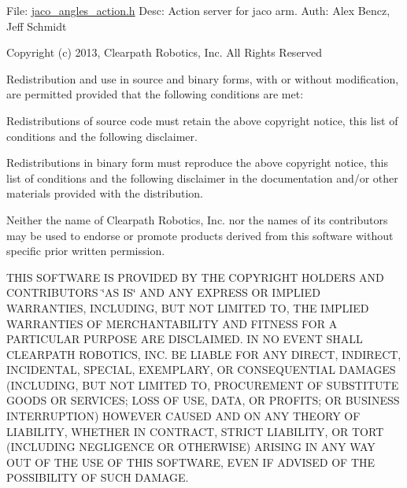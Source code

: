 File\+: \hyperlink{jaco__angles__action_8h}{jaco\+\_\+angles\+\_\+action.\+h} Desc\+: Action server for jaco arm. Auth\+: Alex Bencz, Jeff Schmidt

Copyright (c) 2013, Clearpath Robotics, Inc. All Rights Reserved

Redistribution and use in source and binary forms, with or without modification, are permitted provided that the following conditions are met\+:
\begin{DoxyItemize}
\item Redistributions of source code must retain the above copyright notice, this list of conditions and the following disclaimer.
\item Redistributions in binary form must reproduce the above copyright notice, this list of conditions and the following disclaimer in the documentation and/or other materials provided with the distribution.
\item Neither the name of Clearpath Robotics, Inc. nor the names of its contributors may be used to endorse or promote products derived from this software without specific prior written permission.
\end{DoxyItemize}

T\+H\+IS S\+O\+F\+T\+W\+A\+RE IS P\+R\+O\+V\+I\+D\+ED BY T\+HE C\+O\+P\+Y\+R\+I\+G\+HT H\+O\+L\+D\+E\+RS A\+ND C\+O\+N\+T\+R\+I\+B\+U\+T\+O\+RS \char`\"{}\+A\+S I\+S\char`\"{} A\+ND A\+NY E\+X\+P\+R\+E\+SS OR I\+M\+P\+L\+I\+ED W\+A\+R\+R\+A\+N\+T\+I\+ES, I\+N\+C\+L\+U\+D\+I\+NG, B\+UT N\+OT L\+I\+M\+I\+T\+ED TO, T\+HE I\+M\+P\+L\+I\+ED W\+A\+R\+R\+A\+N\+T\+I\+ES OF M\+E\+R\+C\+H\+A\+N\+T\+A\+B\+I\+L\+I\+TY A\+ND F\+I\+T\+N\+E\+SS F\+OR A P\+A\+R\+T\+I\+C\+U\+L\+AR P\+U\+R\+P\+O\+SE A\+RE D\+I\+S\+C\+L\+A\+I\+M\+ED. IN NO E\+V\+E\+NT S\+H\+A\+LL C\+L\+E\+A\+R\+P\+A\+TH R\+O\+B\+O\+T\+I\+CS, I\+NC. BE L\+I\+A\+B\+LE F\+OR A\+NY D\+I\+R\+E\+CT, I\+N\+D\+I\+R\+E\+CT, I\+N\+C\+I\+D\+E\+N\+T\+AL, S\+P\+E\+C\+I\+AL, E\+X\+E\+M\+P\+L\+A\+RY, OR C\+O\+N\+S\+E\+Q\+U\+E\+N\+T\+I\+AL D\+A\+M\+A\+G\+ES (I\+N\+C\+L\+U\+D\+I\+NG, B\+UT N\+OT L\+I\+M\+I\+T\+ED TO, P\+R\+O\+C\+U\+R\+E\+M\+E\+NT OF S\+U\+B\+S\+T\+I\+T\+U\+TE G\+O\+O\+DS OR S\+E\+R\+V\+I\+C\+ES; L\+O\+SS OF U\+SE, D\+A\+TA, OR P\+R\+O\+F\+I\+TS; OR B\+U\+S\+I\+N\+E\+SS I\+N\+T\+E\+R\+R\+U\+P\+T\+I\+ON) H\+O\+W\+E\+V\+ER C\+A\+U\+S\+ED A\+ND ON A\+NY T\+H\+E\+O\+RY OF L\+I\+A\+B\+I\+L\+I\+TY, W\+H\+E\+T\+H\+ER IN C\+O\+N\+T\+R\+A\+CT, S\+T\+R\+I\+CT L\+I\+A\+B\+I\+L\+I\+TY, OR T\+O\+RT (I\+N\+C\+L\+U\+D\+I\+NG N\+E\+G\+L\+I\+G\+E\+N\+CE OR O\+T\+H\+E\+R\+W\+I\+SE) A\+R\+I\+S\+I\+NG IN A\+NY W\+AY O\+UT OF T\+HE U\+SE OF T\+H\+IS S\+O\+F\+T\+W\+A\+RE, E\+V\+EN IF A\+D\+V\+I\+S\+ED OF T\+HE P\+O\+S\+S\+I\+B\+I\+L\+I\+TY OF S\+U\+CH D\+A\+M\+A\+GE.

